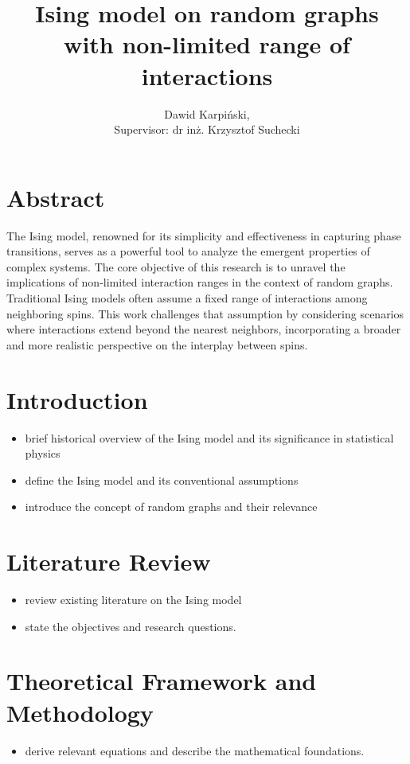 \documentclass[11pt,a4paper]{article}
\begin{document}
\title{Ising model on random graphs with non-limited range of interactions}
\author{Dawid Karpiński,\\Supervisor: dr inż. Krzysztof Suchecki}
\date{}
\maketitle

\section*{Abstract}

The Ising model, renowned for its simplicity and effectiveness in capturing phase transitions, serves as a powerful tool to analyze the emergent properties of complex systems. The core objective of this research is to unravel the implications of non-limited interaction ranges in the context of random graphs. Traditional Ising models often assume a fixed range of interactions among neighboring spins. This work challenges that assumption by considering scenarios where interactions extend beyond the nearest neighbors, incorporating a broader and more realistic perspective on the interplay between spins.

\section{Introduction}
\begin{itemize}
\item brief historical overview of the Ising model and its significance in statistical physics
\item define the Ising model and its conventional assumptions
\item introduce the concept of random graphs and their relevance
\end{itemize}

\section{Literature Review}
\begin{itemize}
\item review existing literature on the Ising model
\item state the objectives and research questions.
\end{itemize}

\section{Theoretical Framework and Methodology}
\begin{itemize}
\item derive relevant equations and describe the mathematical foundations.
\end{itemize}
\end{document}
